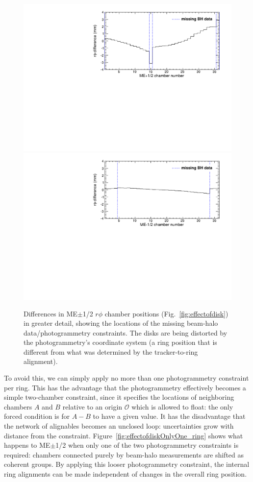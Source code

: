 \documentclass[12pt]{article}
\begin{document}
\begin{figure}
\includegraphics[width=0.5\linewidth]{effectofdisk_ring_mep12.pdf}
\includegraphics[width=0.5\linewidth]{effectofdisk_ring_mem12.pdf}

\caption{Differences in ME$\pm$1/2 $r\phi$ chamber positions
  (Fig.~\ref{fig:effectofdisk}) in greater detail, showing the
  locations of the missing beam-halo data/photogrammetry constraints.
  The disks are being distorted by the photogrammetry's coordinate
  system (a ring position that is different from what was determined
  by the tracker-to-ring alignment). \label{fig:effectofdisk_ring}}
\end{figure}

To avoid this, we can simply apply no more than one photogrammetry
constraint per ring.  This has the advantage that the photogrammetry
effectively becomes a simple two-chamber constraint, since it
specifies the locations of neighboring chambers $A$ and $B$ relative
to an origin $\mathcal{O}$ which is allowed to float: the only forced
condition is for $A-B$ to have a given value.  It has the disadvantage
that the network of alignables becomes an unclosed loop: uncertainties
grow with distance from the constraint.
Figure~\ref{fig:effectofdiskOnlyOne_ring} shows what happens to
ME$\pm$1/2 when only one of the two photogrammetry constraints is
required: chambers connected purely by beam-halo measurements are
shifted as coherent groups.  By applying this looser photogrammetry
constraint, the internal ring alignments can be made independent of
changes in the overall ring position.
\end{document}
